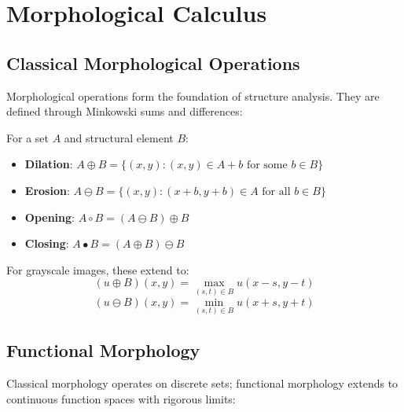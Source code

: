 \documentclass[twocolumn,11pt]{article}
\begin{document}
\section{Morphological Calculus}

\subsection{Classical Morphological Operations}

Morphological operations form the foundation of structure analysis. They are defined through Minkowski sums and differences:

\begin{definition}
For a set $A$ and structural element $B$:
\begin{itemize}
\item \textbf{Dilation}: $A \oplus B = \{(x,y) : (x,y) \in A + b \text{ for some } b \in B\}$
\item \textbf{Erosion}: $A \ominus B = \{(x,y) : (x+b, y+b) \in A \text{ for all } b \in B\}$
\item \textbf{Opening}: $A \circ B = (A \ominus B) \oplus B$
\item \textbf{Closing}: $A \bullet B = (A \oplus B) \ominus B$
\end{itemize}
\end{definition}

For grayscale images, these extend to:
\begin{equation}
(u \oplus B)(x,y) = \max_{(s,t) \in B} u(x-s, y-t)
\end{equation}
\begin{equation}
(u \ominus B)(x,y) = \min_{(s,t) \in B} u(x+s, y+t)
\end{equation}

\subsection{Functional Morphology}

Classical morphology operates on discrete sets; functional morphology extends to continuous function spaces with rigorous limits:
\end{document}
